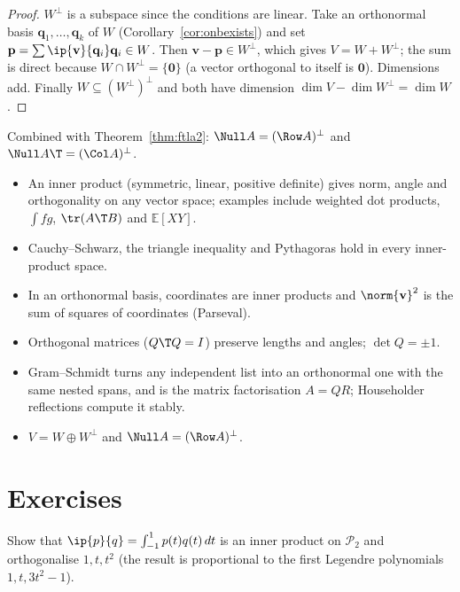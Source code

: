 \begin{proof}
$W^\perp$ is a subspace since the conditions are linear. Take an orthonormal basis $\mathbf{q}_1,\dots,\mathbf{q}_k$ of $W$ (Corollary~\ref{cor:onbexists}) and set $\mathbf{p}=\sum\ip{\mathbf{v}}{\mathbf{q}_i}\mathbf{q}_i\in W$. Then $\mathbf{v}-\mathbf{p}\in W^\perp$, which gives $V=W+W^\perp$; the sum is direct because $W\cap W^\perp=\{\mathbf{0}\}$ (a vector orthogonal to itself is $\mathbf{0}$). Dimensions add. Finally $W\subseteq(W^\perp)^\perp$ and both have dimension $\dim V-\dim W^\perp=\dim W$.
\end{proof}

Combined with Theorem~\ref{thm:ftla2}: $\Null A=(\Row A)^\perp$ and $\Null A\T=(\Col A)^\perp$.

\begin{summarybox}
\begin{itemize}
  \item An inner product (symmetric, linear, positive definite) gives norm, angle and orthogonality on any vector space; examples include weighted dot products, $\int fg$, $\tr(A\T B)$ and $\mathbb{E}[XY]$.
  \item Cauchy--Schwarz, the triangle inequality and Pythagoras hold in every inner-product space.
  \item In an orthonormal basis, coordinates are inner products and $\norm{\mathbf{v}}^2$ is the sum of squares of coordinates (Parseval).
  \item Orthogonal matrices ($Q\T Q=I$) preserve lengths and angles; $\det Q=\pm1$.
  \item Gram--Schmidt turns any independent list into an orthonormal one with the same nested spans, and is the matrix factorisation $A=QR$; Householder reflections compute it stably.
  \item $V=W\oplus W^\perp$ and $\Null A=(\Row A)^\perp$.
\end{itemize}
\end{summarybox}

\section{Exercises}

\begin{exercise}
Show that $\ip{p}{q}=\int_{-1}^1p(t)q(t)\,dt$ is an inner product on $\mathcal{P}_2$ and orthogonalise $1,t,t^2$ (the result is proportional to the first Legendre polynomials $1,t,3t^2-1$).
\end{exercise}

